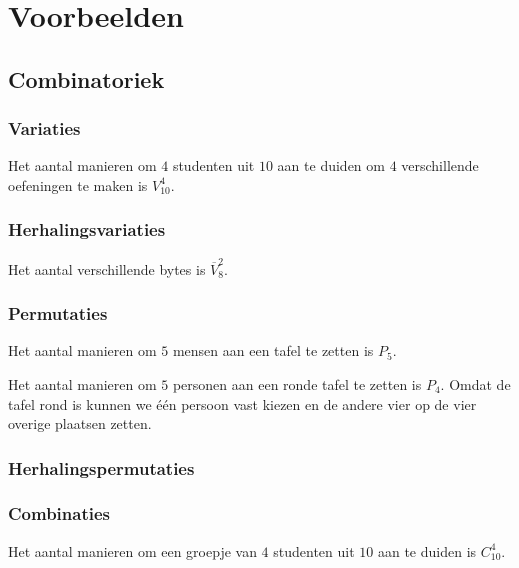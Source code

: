 \documentclass[main.tex]{subfiles}
\begin{document}
\chapter{Voorbeelden}
\label{cha:voorbeelden}

\section{Combinatoriek}
\subsection*{Variaties}
\begin{vb}
  Het aantal manieren om $4$ studenten uit $10$ aan te duiden om $4$ verschillende oefeningen te maken is $V_{10}^{4}$.
\end{vb}

\subsection*{Herhalingsvariaties}
\begin{vb}
  Het aantal verschillende bytes is $\overline{V}_{8}^{2}$.
\end{vb}

\subsection*{Permutaties}

\begin{vb}
  Het aantal manieren om $5$ mensen aan een tafel te zetten is $P_{5}$.
\end{vb}

\begin{vb}
  Het aantal manieren om $5$ personen aan een ronde tafel te zetten is $P_{4}$.
  Omdat de tafel rond is kunnen we \'e\'en persoon vast kiezen en de andere vier op de vier overige plaatsen zetten.
\end{vb}

\subsection*{Herhalingspermutaties}

\subsection*{Combinaties}
\begin{vb}  
  Het aantal manieren om een groepje van $4$ studenten uit $10$ aan te duiden is $C^{4}_{10}$.
\end{vb}
\end{document}
